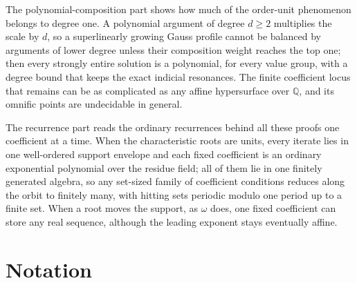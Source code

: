 \documentclass[11pt]{article}
\numberwithin{equation}{section}
\theoremstyle{definition}
\theoremstyle{remark}
\newcommand{\Q}{\mathbb Q}
\begin{document}
The polynomial-composition part shows how much of the order-unit phenomenon
belongs to degree one. A polynomial argument of degree $d\ge2$ multiplies the
scale by $d$, so a superlinearly growing Gauss profile cannot be balanced by
arguments of lower degree unless their composition weight reaches the top
one; then every strongly entire solution is a polynomial, for every value
group, with a degree bound that keeps the exact indicial resonances. The
finite coefficient locus that remains can be as complicated as any affine
hypersurface over $\Q$, and its omnific points are undecidable in general.

The recurrence part reads the ordinary recurrences behind all these proofs one
coefficient at a time. When the characteristic roots are units, every iterate
lies in one well-ordered support envelope and each fixed coefficient is an
ordinary exponential polynomial over the residue field; all of them lie in one
finitely generated algebra, so any set-sized family of coefficient conditions
reduces along the orbit to finitely many, with hitting sets periodic modulo
one period up to a finite set. When a root moves the support, as $\omega$ does,
one fixed coefficient can store any real sequence, although the leading
exponent stays eventually affine.

\appendix

\section{Notation}\label{hol:app:notation}
\end{document}
